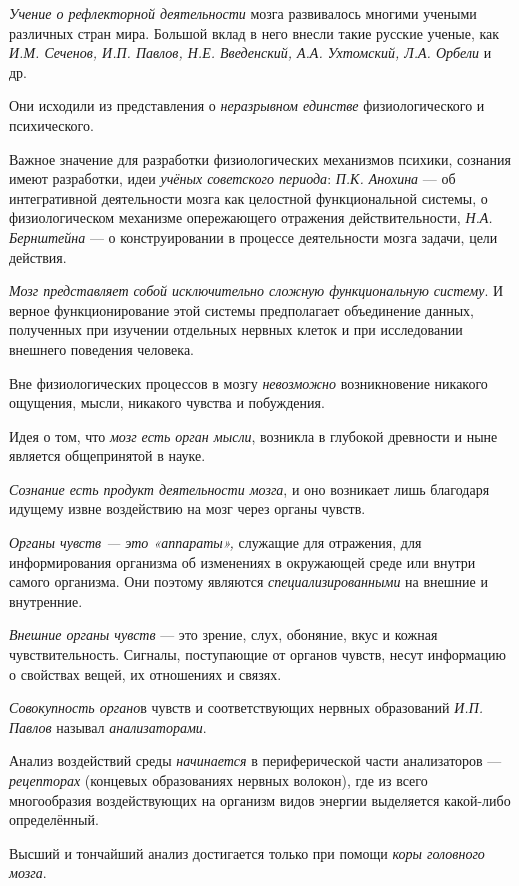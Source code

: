 \documentclass[a4paper,14pt,russian]{extreport}
\begin{document}
\emph{Учение о рефлекторной деятельности} мозга развивалось многими учеными различных стран мира. Большой вклад в него внесли такие русские ученые, как \emph{И.М. Сеченов, И.П. Павлов, Н.Е. Введенский, А.А. Ухтомский, Л.А. Орбели} и др.

Они исходили из представления о \emph{неразрывном единстве} физиологического и психического.

Важное значение для разработки физиологических механизмов психики, сознания имеют разработки, идеи \emph{учёных советского периода}: \emph{П.К. Анохина} --- об интегративной деятельности мозга как целостной функциональной системы, о физиологическом механизме опережающего отражения действительности, \emph{Н.А. Бернштейна} --- о конструировании в процессе деятельности мозга задачи, цели действия.

\emph{Мозг представляет собой исключительно сложную функциональную систему}. И верное функционирование этой системы предполагает объединение данных, полученных при изучении отдельных нервных клеток и при исследовании внешнего поведения человека.

Вне физиологических процессов в мозгу \emph{невозможно} возникновение никакого ощущения, мысли, никакого чувства и побуждения.

Идея о том, что \emph{мозг есть орган мысли}, возникла в глубокой древности и ныне является общепринятой в науке.

\emph{Сознание есть продукт деятельности мозга}, и оно возникает лишь благодаря идущему извне воздействию на мозг через органы чувств.

\emph{Органы чувств} \emph{--- это «аппараты»,} служащие для отражения, для информирования организма об изменениях в окружающей среде или внутри самого организма. Они поэтому являются \emph{специализированными} на внешние и внутренние.

\emph{Внешние органы чувств} --- это зрение, слух, обоняние, вкус и кожная чувствительность. Сигналы, поступающие от органов чувств, несут информацию о свойствах вещей, их отношениях и связях.

\emph{Совокупность органо}в чувств и соответствующих нервных образований \emph{И.П. Павлов} называл \emph{анализаторами}.

Анализ воздействий среды \emph{начинается} в периферической части анализаторов --- \emph{рецепторах} (концевых образованиях нервных волокон), где из всего многообразия воздействующих на организм видов энергии выделяется какой-либо определённый.

Высший и тончайший анализ достигается только при помощи \emph{коры головного мозга}.
\end{document}
